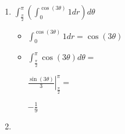 \documentclass[../practica_09.tex]{subfiles}
\begin{document}
    \begin{enumerate}
        \item $\int_{\frac{\pi}{2}}^{\pi} (\int_0^{\cos(3\theta)} 1 dr) d\theta$
        
            \begin{itemize}
                \item $\int_0^{\cos(3\theta)} 1 dr = \cos(3\theta)$
                \item $\int_{\frac{\pi}{2}}^{\pi} \cos(3\theta)  d\theta = $
                
                    $\left. \frac{\sin(3\theta)}{3} \right |_{\frac{\pi}{2}}^{\pi} = $

                    $ - \frac{1}{9} $

            \end{itemize}

        \item $ $
    \end{enumerate}
\end{document}
